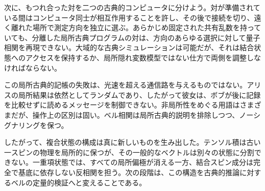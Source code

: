 次に、もつれ合った対を二つの古典的コンピュータに分けよう。対が準備されている間はコンピュータ同士が相互作用することを許し、その後で接続を切り、遠く離れた場所で測定方向を独立に選ぶ。あらかじめ固定された共有乱数を持っていても、分離した局所古典プログラムの対は、方向のあらゆる選択に対して量子相関を再現できない。大域的な古典シミュレーションは可能だが、それは結合状態へのアクセスを保持するか、局所隠れ変数模型ではない仕方で両側を調整しなければならない。

この局所古典的記帳の失敗は、光速を超える通信路を与えるものではない。アリスの局所結果は依然としてランダムであり、したがって彼女は、ボブが後に記録を比較せずに読めるメッセージを制御できない。非局所性をめぐる用語はさまざまだが、操作上の区別は固い。ベル相関は局所古典的説明を排除しつつ、ノーシグナリングを保つ。

したがって、複合状態の構成は真に新しいものを生み出した。テンソル積は古い一スピンの物理を局所的に保つが、その一般的なベクトルは別々の状態に分割できない。一重項状態では、すべての局所偏極が消える一方、結合スピン成分は完全で基底に依存しない反相関を担う。次の段階は、この構造を古典的推論に対するベルの定量的検証へと変えることである。
